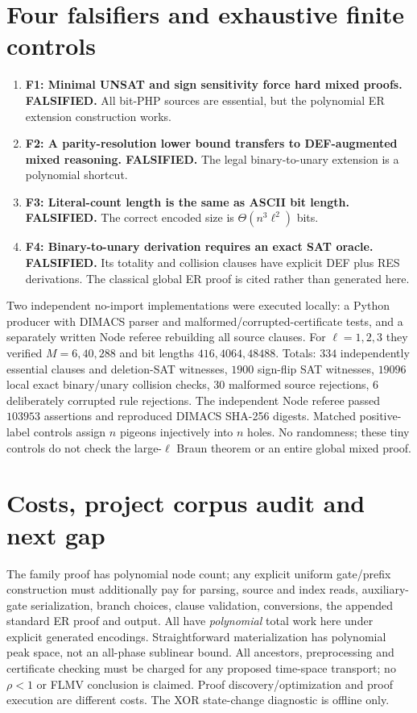 \documentclass[11pt]{article}
\begin{document}
\section{Four falsifiers and exhaustive finite controls}
\begin{enumerate}
\item[] \textbf{F1: Minimal UNSAT and sign sensitivity force hard mixed proofs. FALSIFIED.} All bit-PHP sources are essential, but the polynomial ER extension construction works.
\item[] \textbf{F2: A parity-resolution lower bound transfers to DEF-augmented mixed reasoning. FALSIFIED.} The legal binary-to-unary extension is a polynomial shortcut.
\item[] \textbf{F3: Literal-count length is the same as ASCII bit length. FALSIFIED.} The correct encoded size is $\Theta(n^3\ell^2)$ bits.
\item[] \textbf{F4: Binary-to-unary derivation requires an exact SAT oracle. FALSIFIED.} Its totality and collision clauses have explicit DEF plus RES derivations. The classical global ER proof is cited rather than generated here.
\end{enumerate}
Two independent no-import implementations were executed locally: a Python producer with DIMACS parser and malformed/corrupted-certificate tests, and a separately written Node referee rebuilding all source clauses. For $\ell=1,2,3$ they verified $M=6,40,288$ and bit lengths $416,4064,48488$. Totals: $334$ independently essential clauses and deletion-SAT witnesses, $1900$ sign-flip SAT witnesses, $19096$ local exact binary/unary collision checks, $30$ malformed source rejections, $6$ deliberately corrupted rule rejections. The independent Node referee passed $103953$ assertions and reproduced DIMACS SHA-256 digests. Matched positive-label controls assign $n$ pigeons injectively into $n$ holes. No randomness; these tiny controls do not check the large-$\ell$ Braun theorem or an entire global mixed proof.

\section{Costs, project corpus audit and next gap}
The family proof has polynomial node count; any explicit uniform gate/prefix construction must additionally pay for parsing, source and index reads, auxiliary-gate serialization, branch choices, clause validation, conversions, the appended standard ER proof and output. All have \emph{polynomial} total work here under explicit generated encodings. Straightforward materialization has polynomial peak space, not an all-phase sublinear bound. All ancestors, preprocessing and certificate checking must be charged for any proposed time-space transport; no $\rho<1$ or FLMV conclusion is claimed. Proof discovery/optimization and proof execution are different costs. The XOR state-change diagnostic is offline only.
\end{document}
